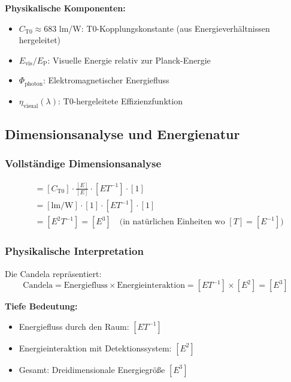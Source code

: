 \documentclass[12pt,a4paper]{article}
\newcommand{\EP}{E_{\text{P}}}
\newcommand{\Evis}{E_{\text{vis}}}
\newcommand{\Cto}{C_{\text{T0}}}
\newcommand{\etavis}{\eta_{\text{visual}}}
\newcommand{\Phiphoton}{\Phi_{\text{photon}}}
\begin{document}
	\textbf{Physikalische Komponenten:}
	\begin{itemize}
		\item $\Cto \approx 683$ lm/W: T0-Kopplungskonstante (aus Energieverhältnissen hergeleitet)
		\item $\Evis/\EP$: Visuelle Energie relativ zur Planck-Energie
		\item $\Phiphoton$: Elektromagnetischer Energiefluss
		\item $\etavis(\lambda)$: T0-hergeleitete Effizienzfunktion
	\end{itemize}
	
	\subsection{Dimensionsanalyse und Energienatur}
	\label{subsec:candela_dimensional}
	
	\subsubsection{Vollständige Dimensionsanalyse}
	\label{subsubsec:candela_vollstaendige_dimensional}
	
	\begin{align}
		[I_{\text{T0}}] &= [\Cto] \cdot \frac{[E]}{[E]} \cdot [E T^{-1}] \cdot [1] \\
		&= [\text{lm/W}] \cdot [1] \cdot [E T^{-1}] \cdot [1] \\
		&= [E^2 T^{-1}] = [E^3] \quad \text{(in natürlichen Einheiten wo } [T] = [E^{-1}])
		\label{eq:candela_dimensionsanalyse}
	\end{align}
	
	\subsubsection{Physikalische Interpretation}
	\label{subsubsec:candela_physikalische_interpretation}
	
	Die Candela repräsentiert:
	\begin{equation}
		\text{Candela} = \text{Energiefluss} \times \text{Energieinteraktion} = [E T^{-1}] \times [E^2] = [E^3]
		\label{eq:candela_interpretation}
	\end{equation}
	
	\textbf{Tiefe Bedeutung:}
	\begin{itemize}
		\item Energiefluss durch den Raum: $[E T^{-1}]$
		\item Energieinteraktion mit Detektionssystem: $[E^2]$
		\item Gesamt: Dreidimensionale Energiegröße $[E^3]$
	\end{itemize}
	
\end{document}
